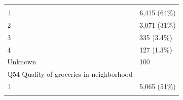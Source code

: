 \documentclass[]{article}
\begin{document}
\begin{longtable}[]{@{}ll@{}}
\begin{minipage}[t]{0.71\columnwidth}
\end{minipage} & \begin{minipage}[t]{0.23\columnwidth}\raggedright
\strut
\end{minipage}\tabularnewline
\begin{minipage}[t]{0.71\columnwidth}\raggedright
1\strut
\end{minipage} & \begin{minipage}[t]{0.23\columnwidth}\raggedright
6,415 (64\%)\strut
\end{minipage}\tabularnewline
\begin{minipage}[t]{0.71\columnwidth}\raggedright
2\strut
\end{minipage} & \begin{minipage}[t]{0.23\columnwidth}\raggedright
3,071 (31\%)\strut
\end{minipage}\tabularnewline
\begin{minipage}[t]{0.71\columnwidth}\raggedright
3\strut
\end{minipage} & \begin{minipage}[t]{0.23\columnwidth}\raggedright
335 (3.4\%)\strut
\end{minipage}\tabularnewline
\begin{minipage}[t]{0.71\columnwidth}\raggedright
4\strut
\end{minipage} & \begin{minipage}[t]{0.23\columnwidth}\raggedright
127 (1.3\%)\strut
\end{minipage}\tabularnewline
\begin{minipage}[t]{0.71\columnwidth}\raggedright
Unknown\strut
\end{minipage} & \begin{minipage}[t]{0.23\columnwidth}\raggedright
100\strut
\end{minipage}\tabularnewline
\begin{minipage}[t]{0.71\columnwidth}\raggedright
Q54 Quality of groceries in neighborhood\strut
\end{minipage} & \begin{minipage}[t]{0.23\columnwidth}\raggedright
\strut
\end{minipage}\tabularnewline
\begin{minipage}[t]{0.71\columnwidth}\raggedright
1\strut
\end{minipage} & \begin{minipage}[t]{0.23\columnwidth}\raggedright
5,065 (51\%)\strut
\end{minipage}\tabularnewline
\begin{minipage}[t]{0.71\columnwidth}\raggedright

\end{minipage}
\end{longtable}
\end{document}

